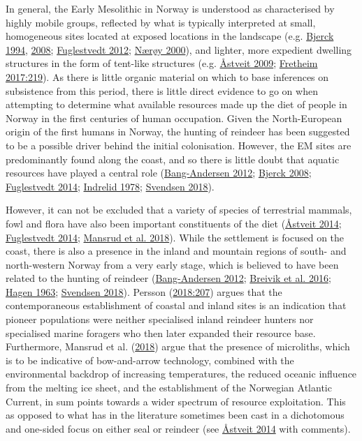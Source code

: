 \documentclass[
  a4paper,
  oneside]{uiophdthesis}
\begin{document}
In general, the Early Mesolithic in Norway is understood as characterised by highly mobile groups, reflected by what is typically interpreted at small, homogeneous sites located at exposed locations in the landscape (e.g. \protect\hyperlink{ref-bjerck1994}{Bjerck 1994}, \protect\hyperlink{ref-bjerck2008}{2008}; \protect\hyperlink{ref-fuglestvedt2012}{Fuglestvedt 2012}; \protect\hyperlink{ref-nuxe6ruxf8y2000}{Nærøy 2000}), and lighter, more expedient dwelling structures in the form of tent-like structures (e.g. \protect\hyperlink{ref-uxe5stveit2009}{Åstveit 2009}; \protect\hyperlink{ref-fretheim2017}{Fretheim 2017:219}). As there is little organic material on which to base inferences on subsistence from this period, there is little direct evidence to go on when attempting to determine what available resources made up the diet of people in Norway in the first centuries of human occupation. Given the North-European origin of the first humans in Norway, the hunting of reindeer has been suggested to be a possible driver behind the initial colonisation. However, the EM sites are predominantly found along the coast, and so there is little doubt that aquatic resources have played a central role (\protect\hyperlink{ref-bang-andersen2012}{Bang-Andersen 2012}; \protect\hyperlink{ref-bjerck2008}{Bjerck 2008}; \protect\hyperlink{ref-fuglestvedt2014}{Fuglestvedt 2014}; \protect\hyperlink{ref-indrelid1978}{Indrelid 1978}; \protect\hyperlink{ref-svendsen2018}{Svendsen 2018}).

However, it can not be excluded that a variety of species of terrestrial mammals, fowl and flora have also been important constituents of the diet (\protect\hyperlink{ref-uxe5stveit2014}{Åstveit 2014}; \protect\hyperlink{ref-fuglestvedt2014}{Fuglestvedt 2014}; \protect\hyperlink{ref-mansrud2018}{Mansrud et al. 2018}). While the settlement is focused on the coast, there is also a presence in the inland and mountain regions of south- and north-western Norway from a very early stage, which is believed to have been related to the hunting of reindeer (\protect\hyperlink{ref-bang-andersen2012}{Bang-Andersen 2012}; \protect\hyperlink{ref-breivik2016}{Breivik et al. 2016}; \protect\hyperlink{ref-hagen1963}{Hagen 1963}; \protect\hyperlink{ref-svendsen2018}{Svendsen 2018}). Persson (\protect\hyperlink{ref-persson2018}{2018:207}) argues that the contemporaneous establishment of coastal and inland sites is an indication that pioneer populations were neither specialised inland reindeer hunters nor specialised marine foragers who then later expanded their resource base. Furthermore, Mansrud et al. (\protect\hyperlink{ref-mansrud2018}{2018}) argue that the presence of microliths, which is to be indicative of bow-and-arrow technology, combined with the environmental backdrop of increasing temperatures, the reduced oceanic influence from the melting ice sheet, and the establishment of the Norwegian Atlantic Current, in sum points towards a wider spectrum of resource exploitation. This as opposed to what has in the literature sometimes been cast in a dichotomous and one-sided focus on either seal or reindeer (see \protect\hyperlink{ref-uxe5stveit2014}{Åstveit 2014} with comments).
\end{document}
